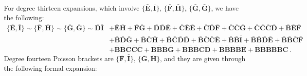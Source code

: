 \documentclass[10pt]{amsart}
\theoremstyle{definition}
\theoremstyle{corollary}
\theoremstyle{remark}
\theoremstyle{conclusion}
\begin{document}
  For degree thirteen expansions, which involve $\{\bar{\mathbf{E}},\bar{\mathbf{I}} \}$,  $\{\bar{\mathbf{F}},\bar{\mathbf{H}} \}$, $\{\bar{\mathbf{G}},\bar{\mathbf{G}} \}$, we  have the following:
\begin{align}
	\{\bar{\mathbf{E}}, \bar{\mathbf{I}}\} \sim \{\bar{\mathbf{F}}, \bar{\mathbf{H}}\}\sim \{\bar{\mathbf{G}},\bar{ \mathbf{G}}\}   \sim \bar{\mathbf{D}}\bar{\mathbf{I}} &+\bar{\mathbf{E}}\bar{\mathbf{H}}+ \bar{\mathbf{F}}\bar{\mathbf{G}}+ \bar{\mathbf{D}}\bar{\mathbf{D}}\bar{\mathbf{E}}+\bar{\mathbf{C}}\bar{\mathbf{E}}\bar{\mathbf{E}}+\bar{\mathbf{C}}\bar{\mathbf{D}}\bar{\mathbf{F}}+\bar{\mathbf{C}}\bar{\mathbf{C}}\bar{\mathbf{G}}+\bar{\mathbf{C}}\bar{\mathbf{C}}\bar{\mathbf{C}}\bar{\mathbf{D}}+\bar{\mathbf{B}}\bar{\mathbf{E}}\bar{\mathbf{F}} \nonumber \\
	&+\bar{\mathbf{B}}\bar{\mathbf{D}}\bar{\mathbf{G}}+\bar{\mathbf{B}}\bar{\mathbf{C}}\bar{\mathbf{H}}+\bar{\mathbf{B}}\bar{\mathbf{C}}\bar{\mathbf{D}}\bar{\mathbf{D}}+\bar{\mathbf{B}}\bar{\mathbf{C}}\bar{\mathbf{C}}\bar{\mathbf{E}}+\bar{\mathbf{B}}\bar{\mathbf{B}}\bar{\mathbf{I}}+\bar{\mathbf{B}}\bar{\mathbf{B}}\bar{\mathbf{D}}\bar{\mathbf{E}}+\bar{\mathbf{B}}\bar{\mathbf{B}}\bar{\mathbf{C}}\bar{\mathbf{F}}\nonumber \\
	&+\bar{\mathbf{B}}\bar{\mathbf{B}}\bar{\mathbf{C}}\bar{\mathbf{C}}\bar{\mathbf{C}}+\bar{\mathbf{B}}\bar{\mathbf{B}}\bar{\mathbf{B}}\bar{\mathbf{G}}+\bar{\mathbf{B}}\bar{\mathbf{B}}\bar{\mathbf{B}}\bar{\mathbf{C}}\bar{\mathbf{D}}+\bar{\mathbf{B}}\bar{\mathbf{B}}\bar{\mathbf{B}}\bar{\mathbf{B}}\bar{\mathbf{E}}+\bar{\mathbf{B}}\bar{\mathbf{B}}\bar{\mathbf{B}}\bar{\mathbf{B}}\bar{\mathbf{B}}\bar{\mathbf{C}} \, .
\end{align}
Degree fourteen Poisson brackets are $\{\bar{\mathbf{F}},\bar{\mathbf{I}} \}$,  $\{\bar{\mathbf{G}},\bar{\mathbf{H}} \}$, and they are given through the following formal expansion:
\end{document}
